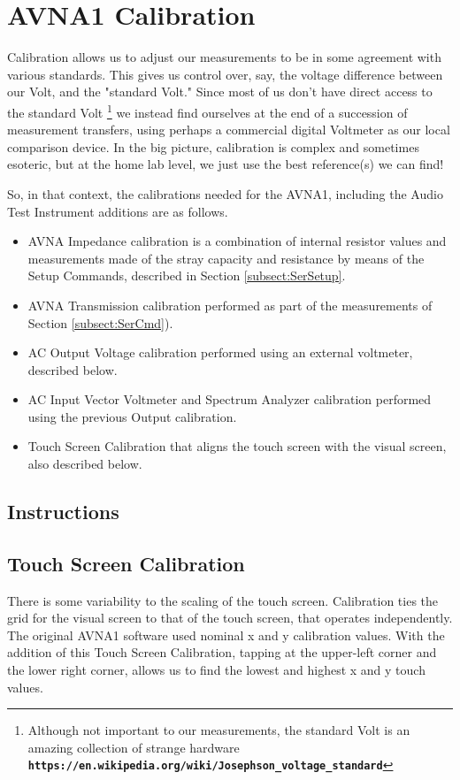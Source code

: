 \section{AVNA1 Calibration}
\label{sect:Cal}

Calibration allows us to adjust our measurements to be in some agreement with various standards.  This gives us control over, say, the voltage difference between our Volt, and the "standard Volt."  Since  most of us don't have direct access to the standard Volt
 \footnote{Although not important to our measurements, the standard Volt is an amazing collection of strange hardware
\textbf{  \texttt{https://en.wikipedia.org/wiki/Josephson\_voltage\_standard}  }
}
we instead find ourselves at the end of a succession of measurement transfers, using perhaps a commercial digital Voltmeter as our local comparison device.  In the big picture, calibration is complex and sometimes esoteric, but at the home lab level, we just use the best reference(s) we can find! 

So, in that context, the calibrations needed for the AVNA1, including the Audio Test Instrument additions are as follows.

\begin{itemize}
  \item AVNA Impedance calibration is a combination of internal resistor values and measurements made of the stray capacity and resistance by means of the Setup Commands, described in Section \ref{subsect:SerSetup}.
  \item AVNA Transmission calibration performed as part of the measurements of Section \ref{subsect:SerCmd}).
  \item AC Output Voltage calibration performed using an external voltmeter, described below.
  \item AC Input Vector Voltmeter and Spectrum Analyzer calibration performed using the previous Output calibration.
  \item Touch Screen Calibration that aligns the touch screen with the visual screen, also described below.
\end{itemize}

\subsection{Instructions}
\label{subsect:CalInstr}
\subsection{Touch Screen Calibration} There is some variability to the scaling of the touch screen.  Calibration ties the grid for the visual screen to that of the touch screen, that operates independently.  The original AVNA1 software used nominal x and y calibration values.  With the addition of this Touch Screen Calibration,   tapping at the upper-left corner and the lower right corner, allows us to find the lowest and highest x and y touch values.

